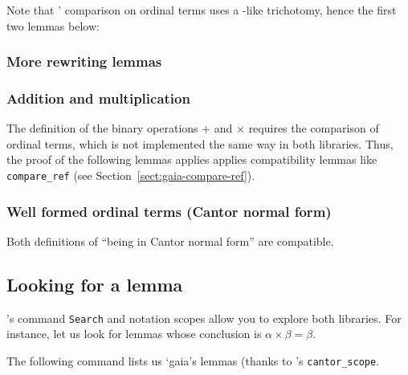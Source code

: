 Note that \HydrasLib' comparison on ordinal terms uses a
\stdpp-like trichotomy, hence the first two lemmas below:

\label{sect:gaia-compare-ref}



\subsubsection{More rewriting lemmas}






\subsubsection{Addition and multiplication}
\label{sect:plus-mult-gaia-hydras}

The definition of the binary operations $+$ and $\times$
requires the comparison of ordinal terms, which is not implemented the same way in both libraries. Thus, the proof of the following lemmas applies applies
compatibility lemmas like \texttt{compare\_ref} (see Section~\vref{sect:gaia-compare-ref}).




\subsubsection{Well formed ordinal terms (Cantor normal form)}
\label{nf-gaia-compat}
Both definitions of ``being in Cantor normal form'' are
compatible.




\subsection{Looking for a lemma}
\coq's command \texttt{Search} and notation scopes allow you to explore both libraries.
For instance, let us look for lemmas whose conclusion is
$\alpha \times \beta=\beta$.

The following command lists us `gaia's lemmas (thanks to
\gaia's  \texttt{cantor\_scope}.

